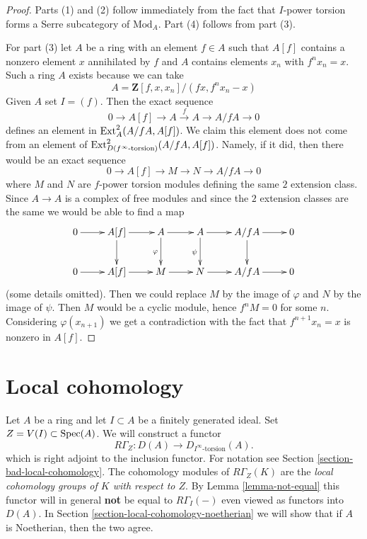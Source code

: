 \begin{proof}
Parts (1) and (2) follow immediately from the fact that $I$-power torsion
forms a Serre subcategory of $\text{Mod}_A$. Part (4) follows from
part (3).

\medskip\noindent
For part (3) let $A$ be a ring with an element $f \in A$ such that
$A[f]$ contains a nonzero element $x$ annihilated by $f$ and
$A$ contains elements $x_n$ with $f^nx_n = x$. Such a ring $A$
exists because we can take
$$
A = \mathbf{Z}[f, x, x_n]/(fx, f^nx_n - x)
$$
Given $A$ set $I = (f)$. Then the exact sequence
$$
0 \to A[f] \to A \xrightarrow{f} A \to A/fA \to 0
$$
defines an element in $\mathop{\mathrm{Ext}}\nolimits^2_A(A/fA, A[f])$. We claim this
element does not come from an element of
$\mathop{\mathrm{Ext}}\nolimits^2_{D(f^\infty\text{-torsion})}(A/fA, A[f])$.
Namely, if it did, then there would be an exact sequence
$$
0 \to A[f] \to M \to N \to A/fA \to 0
$$
where $M$ and $N$ are $f$-power torsion modules defining the same
$2$ extension class. Since $A \to A$ is a complex of free modules
and since the $2$ extension classes are the same
we would be able to find a map
$$
\xymatrix{
0 \ar[r] &
A[f] \ar[r] \ar[d] &
A \ar[r] \ar[d]_\varphi &
A \ar[r] \ar[d]_\psi &
A/fA \ar[r] \ar[d] & 0 \\
0 \ar[r] &
A[f] \ar[r] &
M \ar[r] &
N \ar[r] &
A/fA \ar[r] & 0
}
$$
(some details omitted). Then we could replace $M$ by the image of
$\varphi$ and $N$ by the image of $\psi$. Then $M$ would be a cyclic
module, hence $f^n M = 0$ for some $n$. Considering $\varphi(x_{n + 1})$
we get a contradiction with the fact that $f^{n + 1}x_n = x$ is
nonzero in $A[f]$.
\end{proof}









\section{Local cohomology}
\label{section-local-cohomology}

\noindent
Let $A$ be a ring and let $I \subset A$ be a finitely generated ideal.
Set $Z = V(I) \subset \mathop{\mathrm{Spec}}(A)$. We will construct a functor
\begin{equation}
\label{equation-local-cohomology}
R\Gamma_Z : D(A) \longrightarrow D_{I^\infty\text{-torsion}}(A).
\end{equation}
which is right adjoint to the inclusion functor. For notation
see Section \ref{section-bad-local-cohomology}. The cohomology
modules of $R\Gamma_Z(K)$ are the {\it local cohomology groups
of $K$ with respect to $Z$}.
By Lemma \ref{lemma-not-equal} this functor will in general {\bf not} be
equal to $R\Gamma_I( - )$ even viewed as functors into $D(A)$.
In Section \ref{section-local-cohomology-noetherian}
we will show that if $A$ is Noetherian, then the two agree.

